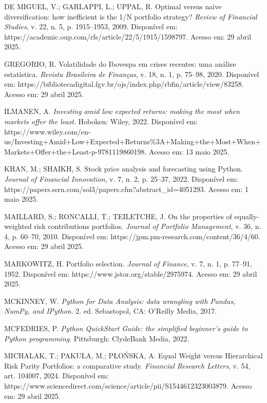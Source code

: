 \begin{thebibliography}{99}
DE MIGUEL, V.; GARLAPPI, L.; UPPAL, R. Optimal versus naïve diversification: how inefficient is the 1/N portfolio strategy? \textit{Review of Financial Studies}, v. 22, n. 5, p. 1915--1953, 2009. Disponível em: https://academic.oup.com/rfs/article/22/5/1915/1598797. Acesso em: 29 abril 2025.

GREGORIO, R. Volatilidade do Ibovespa em crises recentes: uma análise estatística. \textit{Revista Brasileira de Finanças}, v. 18, n. 1, p. 75--98, 2020. Disponível em: https://bibliotecadigital.fgv.br/ojs/index.php/rbfin/article/view/83258. Acesso em: 29 abril 2025.

ILMANEN, A. \textit{Investing amid low expected returns: making the most when markets offer the least}. Hoboken: Wiley, 2022. Disponível em: https://www.wiley.com/en-us/Investing+Amid+Low+Expected+Returns\%3A+Making+the+Most+When+Markets+Offer+the+Least-p-9781119860198. Acesso em: 13 maio 2025.

KHAN, M.; SHAIKH, S. Stock price analysis and forecasting using Python. \textit{Journal of Financial Innovation}, v. 7, n. 2, p. 25--37, 2022. Disponível em: https://papers.ssrn.com/sol3/papers.cfm?abstract\_id=4051293. Acesso em: 1 maio 2025.

MAILLARD, S.; RONCALLI, T.; TEILETCHE, J. On the properties of equally-weighted risk contributions portfolios. \textit{Journal of Portfolio Management}, v. 36, n. 4, p. 60--70, 2010. Disponível em: https://jpm.pm-research.com/content/36/4/60. Acesso em: 29 abril 2025.

MARKOWITZ, H. Portfolio selection. \textit{Journal of Finance}, v. 7, n. 1, p. 77--91, 1952. Disponível em: https://www.jstor.org/stable/2975974. Acesso em: 29 abril 2025.

MCKINNEY, W. \textit{Python for Data Analysis: data wrangling with Pandas, NumPy, and IPython}. 2. ed. Sebastopol, CA: O'Reilly Media, 2017.

MCFEDRIES, P. \textit{Python QuickStart Guide: the simplified beginner's guide to Python programming}. Pittsburgh: ClydeBank Media, 2022.

MICHALAK, T.; PAKUŁA, M.; PŁOŃSKA, A. Equal Weight versus Hierarchical Risk Parity Portfolios: a comparative study. \textit{Financial Research Letters}, v. 54, art. 104007, 2024. Disponível em: https://www.sciencedirect.com/science/article/pii/S1544612323003879. Acesso em: 29 abril 2025.


\end{thebibliography}
